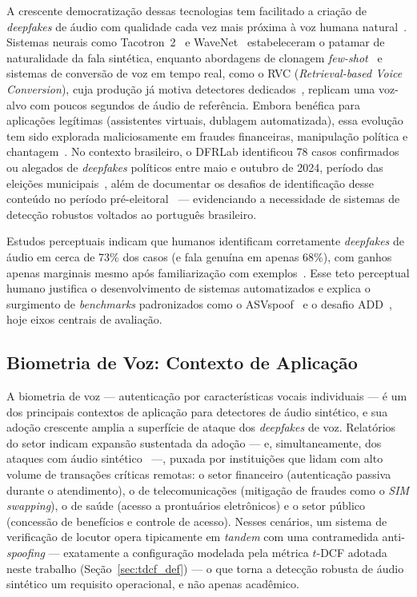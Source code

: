 \documentclass[12pt,a4paper]{article}
\begin{document}
A crescente democratização dessas tecnologias tem facilitado a criação de
\textit{deepfakes} de áudio com qualidade cada vez mais próxima à voz humana
natural~\cite{mai2023warning, heidari2024deepfake}. Sistemas neurais como
Tacotron~2~\cite{shen2018natural} e WaveNet~\cite{oord2016wavenet}
estabeleceram o patamar de naturalidade da fala sintética, enquanto abordagens
de clonagem \textit{few-shot}~\cite{jia2018, wang2023vall} e sistemas de
conversão de voz em tempo real, como o RVC (\textit{Retrieval-based Voice
	Conversion}), cuja produção já motiva detectores dedicados~\cite{bird2023realtime}, replicam uma voz-alvo com poucos segundos de áudio de
referência. Embora benéfica para aplicações legítimas (assistentes virtuais,
dublagem automatizada), essa evolução tem sido explorada maliciosamente em
fraudes financeiras, manipulação política e chantagem~\cite{pindrop2025, dfrlab2024}. No contexto brasileiro, o DFRLab identificou
\num{78} casos confirmados ou alegados de \textit{deepfakes} políticos entre
maio e outubro de 2024, período das eleições municipais~\cite{dfrlab2024},
além de
documentar os desafios de identificação desse conteúdo no período
pré-eleitoral~\cite{farrugia2024} --- evidenciando a necessidade de sistemas
de detecção robustos voltados ao português brasileiro.

Estudos perceptuais indicam que humanos identificam corretamente
\textit{deepfakes} de áudio em cerca de \num{73}\% dos casos (e fala genuína em
apenas \num{68}\%), com ganhos apenas marginais mesmo após familiarização com
exemplos~\cite{mai2023warning}. Esse teto perceptual humano justifica o
desenvolvimento de sistemas automatizados e explica o surgimento de
\textit{benchmarks} padronizados como o ASVspoof~\cite{todisco2019asvspoof, yamagishi2021asvspoof, wang2024asvspoof5} e o desafio
ADD~\cite{yi2022add}, hoje eixos centrais de avaliação.

\subsection{Biometria de Voz: Contexto de Aplicação}
\label{sec:biometria_voz}

A biometria de voz --- autenticação por características vocais individuais ---
é um dos principais contextos de aplicação para detectores de áudio sintético,
e sua adoção crescente amplia a superfície de ataque dos \textit{deepfakes} de
voz. Relatórios do setor indicam expansão sustentada da adoção --- e,
simultaneamente, dos ataques com áudio sintético~\cite{pindrop2025} ---, puxada
por instituições que lidam com alto volume de transações críticas remotas: o
setor financeiro (autenticação passiva durante o atendimento), o de
telecomunicações (mitigação de fraudes como o \textit{SIM swapping}), o de
saúde (acesso a prontuários eletrônicos) e o setor público (concessão de
benefícios e controle de acesso). Nesses cenários, um sistema de verificação de locutor
opera tipicamente em \textit{tandem} com uma contramedida anti-\textit{spoofing}
--- exatamente a configuração modelada pela métrica $t$-DCF adotada neste
trabalho (Seção~\ref{sec:tdcf_def}) --- o que torna a detecção robusta de
áudio sintético um requisito operacional, e não apenas acadêmico.
\end{document}
